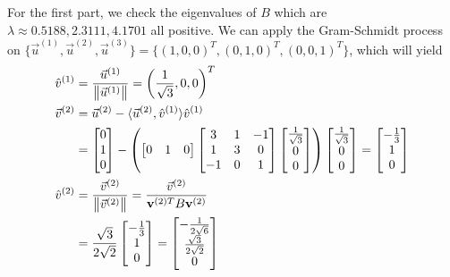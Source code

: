 \begin{Answer}
For the first part, we check the eigenvalues of $B$ which are $\lambda \approx 0.5188, 2.3111, 4.1701$ all positive. We can apply the Gram-Schmidt process on $\{\vec{u}^{(1)}, \vec{u}^{(2)}, \vec{u}^{(3)}\} = \{(1,0,0)^T, (0,1,0)^T, (0,0,1)^T\}$, which will yield
\begin{align*}
\hat{v}^{(1)} &= \frac{\vec{u}^{(1)}}{\norm{\vec{u}^{(1)}}} = \left(\frac{1}{\sqrt{3}},0,0\right)^T \\
\vec{v}^{(2)} &= \vec{u}^{(2)} - \langle \vec{u}^{(2)}, \hat{v}^{(1)}\rangle\hat{v}^{(1)} \\
&= \begin{bmatrix}
0 \\
1 \\
0
\end{bmatrix}
-
\left(\begin{bmatrix}
0 & 1 & 0
\end{bmatrix}
\begin{bmatrix}
3 & 1 & -1 \\ 
1 & 3 & 0 \\ 
-1 & 0 & 1
\end{bmatrix}
\begin{bmatrix}
\frac{1}{\sqrt{3}} \\
0 \\
0
\end{bmatrix}\right)
\begin{bmatrix}
\frac{1}{\sqrt{3}} \\
0 \\
0
\end{bmatrix}
=
\begin{bmatrix}
-\frac{1}{3} \\
1 \\
0
\end{bmatrix} \\
\hat{v}^{(2)} &= \frac{\vec{v}^{(2)}}{\norm{\vec{v}^{(2)}}} = \frac{\vec{v}^{(2)}}{\textbf{v}^{{(2)}T}B\textbf{v}^{(2)}}  \\
&=
\frac{\sqrt{3}}{2\sqrt{2}}
\begin{bmatrix}
-\frac{1}{3} \\
1 \\
0
\end{bmatrix}
=
\begin{bmatrix}
-\frac{1}{2\sqrt{6}}\\ 
\frac{\sqrt{3}}{2\sqrt{2}}\\ 
0
\end{bmatrix} \\

\end{align*}
\end{Answer}
